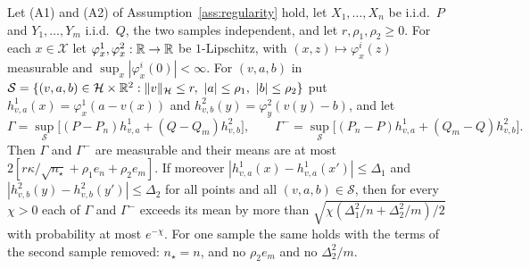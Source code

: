 \begin{lemma}
\label{lem:hinge}
Let (A1) and (A2) of Assumption~\ref{ass:regularity} hold, let $X_1,\dots,X_n$ be i.i.d.\ $P$ and $Y_1,\dots,Y_m$
i.i.d.\ $Q$, the two samples independent, and let $r,\rho_1,\rho_2\ge0$. For each $x\in\mathcal X$ let
$\varphi^1_x,\varphi^2_x:\mathbb{R}\to\mathbb{R}$ be $1$-Lipschitz, with $(x,z)\mapsto\varphi^i_x(z)$ measurable and $\sup_x|\varphi^i_x(0)|<\infty$.
For $(v,a,b)$ in $\mathcal S=\{(v,a,b)\in\Hh\times\R^2:\|v\|_\Hh\le r,\ |a|\le\rho_1,\ |b|\le\rho_2\}$ put
$h^1_{v,a}(x)=\varphi^1_x(a-v(x))$ and $h^2_{v,b}(y)=\varphi^2_y(v(y)-b)$, and let
\[
\Gamma=\sup_{\mathcal S}\big[(P-P_n)h^1_{v,a}+(Q-Q_m)h^2_{v,b}\big],
\qquad
\Gamma^-=\sup_{\mathcal S}\big[(P_n-P)h^1_{v,a}+(Q_m-Q)h^2_{v,b}\big].
\]
Then $\Gamma$ and $\Gamma^-$ are measurable and their means are at most $2[r\kappa/\sqrt{n_\star}+\rho_1e_n+\rho_2e_m]$. If moreover
$|h^1_{v,a}(x)-h^1_{v,a}(x')|\le\Delta_1$ and $|h^2_{v,b}(y)-h^2_{v,b}(y')|\le\Delta_2$ for all points and all
$(v,a,b)\in\mathcal S$, then for every $\chi>0$ each of $\Gamma$ and $\Gamma^-$ exceeds its mean by more than
$\sqrt{\chi(\Delta_1^2/n+\Delta_2^2/m)/2}$ with probability at most $e^{-\chi}$. For one sample the same holds with the
terms of the second sample removed: $n_\star=n$, and no $\rho_2e_m$ and no $\Delta_2^2/m$.
\end{lemma}

